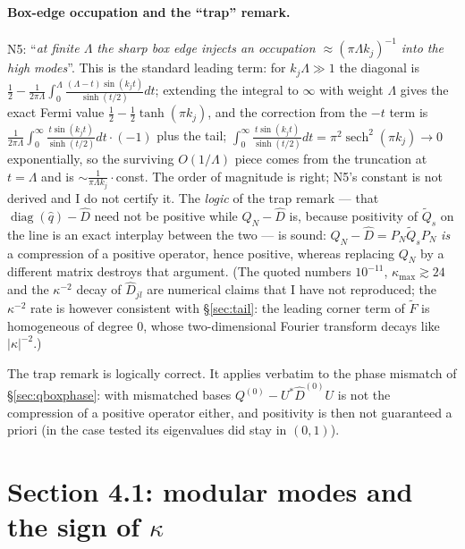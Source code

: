 \documentclass[11pt]{article}
\begin{document}
\paragraph{Box-edge occupation and the ``trap'' remark.}
N5: ``\emph{at finite $\Lambda$ the sharp box edge injects an occupation
$\approx(\pi\Lambda k_j)^{-1}$ into the high modes}''.  This is the standard leading term:
for $k_j\Lambda\gg1$ the diagonal is
$\tfrac12-\tfrac1{2\pi\Lambda}\int_0^\Lambda\frac{(\Lambda-t)\sin(k_jt)}{\sinh(t/2)}dt$; extending
the integral to $\infty$ with weight $\Lambda$ gives the exact Fermi value
$\tfrac12-\tfrac12\tanh(\pi k_j)$, and the correction from the $-t$ term is
$\tfrac1{2\pi\Lambda}\int_0^\infty\frac{t\sin(k_jt)}{\sinh(t/2)}dt\cdot(-1)$ plus the tail;
$\int_0^\infty\frac{t\sin(k_jt)}{\sinh(t/2)}dt=\pi^2\operatorname{sech}^2(\pi k_j)\to0$
exponentially, so the surviving $O(1/\Lambda)$ piece comes from the truncation at $t=\Lambda$ and
is $\sim\frac1{\pi\Lambda k_j}\cdot$const.  The order of magnitude is right; N5's constant is not
derived and I do not certify it.  The \emph{logic} of the trap remark --- that
$\operatorname{diag}(\widehat q)-\widehat D$ need not be positive while
$Q_N-\widehat D$ is, because positivity of $\widetilde Q_s$ on the line is an exact interplay
between the two --- is sound: $Q_N-\widehat D=P_N\widetilde Q_sP_N$ \emph{is} a compression of a
positive operator, hence positive, whereas replacing $Q_N$ by a different matrix destroys that
argument.  (The quoted numbers $10^{-11}$, $\kappa_{\max}\gtrsim24$ and the $\kappa^{-2}$ decay
of $\widehat D_{jl}$ are numerical claims that I have not reproduced; the $\kappa^{-2}$ rate is
however consistent with \S\ref{sec:tail}: the leading corner term of $\widetilde F$ is
homogeneous of degree $0$, whose two-dimensional Fourier transform decays like $|\kappa|^{-2}$.)
\begin{verdictok}
The trap remark is logically correct.  It applies verbatim to the phase mismatch of
\S\ref{sec:qboxphase}: with mismatched bases $Q^{(0)}-U^*\widehat D^{(0)}U$ is not the compression
of a positive operator either, and positivity is then not guaranteed a priori (in the case tested
its eigenvalues did stay in $(0,1)$).
\end{verdictok}

\section{Section 4.1: modular modes and the sign of $\kappa$}\label{sec:modes}
\end{document}
